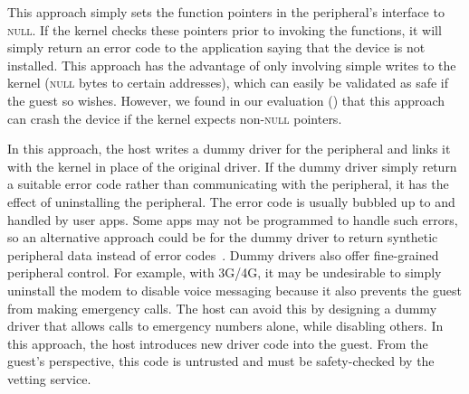 \begin{mylist} 
%
\item {} This
approach simply sets the function pointers in the peripheral's interface to
\textsc{null}. If the kernel checks these pointers prior to invoking the
functions, it will simply return an error code to the application saying that
the device is not installed. This approach has the advantage of only involving
simple writes to the kernel (\textsc{null} bytes to certain addresses), which
can easily be validated as safe if the guest so wishes. However, we found in
our evaluation () that this approach can crash the
device if the kernel expects non-\textsc{null} pointers.
%
\item {} In this approach,
the host writes a dummy driver for the peripheral and links it with the kernel
in place of the original driver. If the dummy driver simply return a suitable
error code rather than communicating with the peripheral, it has the effect of
uninstalling the peripheral. The error code is usually bubbled up to and
handled by user apps. Some apps may not be programmed to handle such errors, so
an alternative approach could be for the dummy driver to return synthetic
peripheral data instead of error codes~\cite{mockdroid:hotmobile10}. Dummy
drivers also offer fine-grained peripheral control. For example, with
3G/4G, it may be undesirable to simply uninstall the modem to disable voice
messaging because it also prevents the guest from making emergency calls. The
host can avoid this by designing a dummy driver that allows calls to emergency
numbers alone, while disabling others. In this approach, the host introduces
new driver code into the guest. From the guest's perspective, this code is
untrusted and must be safety-checked by the vetting service.

\end{mylist}

